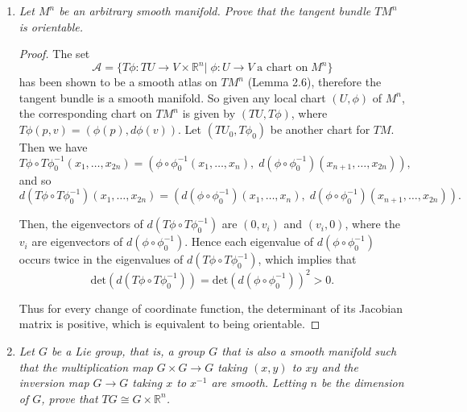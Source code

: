 \documentclass{article}
\begin{document}
\begin{enumerate}[label={\bf Q\arabic*:}]
    \begin{proof}
      Given arbitrary $x\in X^k$ with $i(x)\in f(M_1^{n_1})$, there exist
      by the immersion theorem, an open $U_x\subset X^k$ containing $x$, an
      open $U_2\subset M_2^{n_2}$, an open $V\subset\mathbb{R}^{n_2-k}$,
      $v_0\in V$, and a diffeomorphism $\phi:U_2\rightarrow U_x\times V$
      such that $\phi(i(u))=(u,v_0)$ for all $u\in U_x$.
    \end{proof}

  \item \it Let $M^n$ be an arbitrary smooth manifold. Prove that the tangent
    bundle $TM^n$ is orientable.

    \begin{proof}
      The set 
      \[\mathcal{A} = \{T\phi:TU\rightarrow V\times\mathbb{R}^n|\;
        \phi:U\rightarrow V\; \text{a chart on}\; M^n\}\]
      has been shown to be a smooth atlas on $TM^n$ (Lemma 2.6), therefore
      the tangent bundle is a smooth manifold. So given any local chart
      $(U,\phi)$ of $M^n$, the corresponding chart on $TM^n$ is given by
      $(TU,T\phi)$, where $T\phi(p,v)=(\phi(p),d\phi(v))$. Let
      $(TU_0,T\phi_0)$ be another chart for $TM$. Then we have
      \[T\phi\circ T\phi_0^{-1}(x_1,\ldots,x_{2n})
        =(\phi\circ\phi_0^{-1}(x_1,\ldots,x_n),\; d(\phi\circ\phi_0^{-1})
        (x_{n+1},\ldots,x_{2n})),\]
      and so
      \[d(T\phi\circ T\phi_0^{-1})(x_{1},\ldots,x_{2n})
        =(d(\phi\circ\phi_0^{-1})(x_{1},\ldots,x_{n}),\;
        d(\phi\circ\phi_0^{-1})(x_{n+1},\ldots,x_{2n})).\]

      Then, the eigenvectors of $d(T\phi\circ T\phi_0^{-1})$ are $(0,v_i)$
      and $(v_i,0)$, where the $v_i$ are eigenvectors of
      $d(\phi\circ\phi_0^{-1})$. Hence each eigenvalue of
      $d(\phi\circ\phi_0^{-1})$ occurs twice in the eigenvalues of
      $d(T\phi\circ T\phi_0^{-1})$, which implies that
      \[\text{det}(d(T\phi\circ T\phi_0^{-1}))
      =\text{det}(d(\phi\circ\phi_0^{-1}))^2 >0.\]

      Thus for every change of coordinate function, the determinant of its
      Jacobian matrix is positive, which is equivalent to being orientable.
    \end{proof}

  \item \it Let $G$ be a Lie group, that is, a group $G$ that is also a
    smooth manifold such that the multiplication map $G\times G\rightarrow
    G$ taking $(x,y)$ to $xy$ and the inversion map $G\rightarrow G$ taking
    $x$ to $x^{-1}$ are smooth. Letting $n$ be the dimension of $G$, prove
    that $TG\cong G\times\mathbb{R}^n$.


\end{enumerate}
\end{document}
